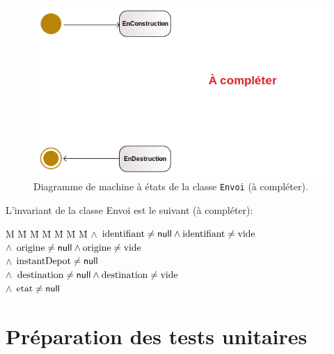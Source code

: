 \documentclass[11pt,article]{article}
\newcommand{\nullvalue}{\textsf{null}\xspace}
\begin{document}
\begin{figure}[ht!]
\begin{center}
\includegraphics[scale=0.5]{Diagrammes/smarttsi_uml_diag_machine_a_etats_envoi}
\caption{Diagramme de machine à états de la classe \texttt{Envoi} {\color{red}(à compléter)}.}
\end{center}
\label{umlet_diag_machine_a_etats_envoi}
\end{figure}

\newcommand{\emptystring}{\ensuremath\mathrm{vide}}
\newcommand{\identifiant}{\ensuremath\mathrm{identifiant}}
\newcommand{\origine}{\ensuremath\mathrm{origine}}
\newcommand{\instantDepot}{\ensuremath\mathrm{instantDepot}}
\newcommand{\destination}{\ensuremath\mathrm{destination}}
\newcommand{\instantLivraison}{\ensuremath\mathrm{instantLivraison}}
\newcommand{\etat}{\ensuremath\mathrm{etat}}
L'invariant de la classe \textsf{Envoi} est le suivant {\color{red}(à compléter)}:
\begin{tabbing}
M \= M \= M \= M \= M \= M \= M \kill
\> $\land$ \> $\identifiant \neq \nullvalue \land \identifiant \neq \emptystring$\\
\> $\land$ \> $\origine \neq \nullvalue \land \origine \neq \emptystring$\\
\> $\land$ \> $\instantDepot \neq \nullvalue$\\
\> $\land$ \> $\destination \neq \nullvalue \land \destination \neq \emptystring$\\
\> $\land$ \> $\etat \neq \nullvalue$\\
\end{tabbing}

\newpage

\section{Préparation des tests unitaires}
\end{document}

